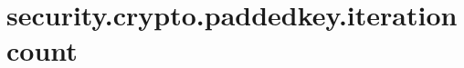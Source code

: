 \section{security.crypto.paddedkey.iterationcount}
\label{configuration:SecurityCryptoPaddedkeyIterationcount}
\TODO
